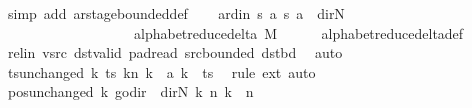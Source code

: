 \begin{isabellebody}
\ {\isacharparenleft}{\kern0pt}simp\ add{\isacharcolon}{\kern0pt}\ ar{\isacharunderscore}{\kern0pt}stage{\isacharunderscore}{\kern0pt}bounded{\isacharunderscore}{\kern0pt}def{\isacharparenright}{\kern0pt}\isanewline
\ \ \isamarkupfalse%
\ ard{\isacharunderscore}{\kern0pt}in{\isacharcolon}{\kern0pt}\ {\isachardoublequoteopen}{\isacharparenleft}{\kern0pt}{\isacharquery}{\kern0pt}s{\isacharcomma}{\kern0pt}\ {\isacharquery}{\kern0pt}a{\isacharcomma}{\kern0pt}\ {\isacharquery}{\kern0pt}s{\isacharprime}{\kern0pt}{\isacharcomma}{\kern0pt}\ {\isacharquery}{\kern0pt}a{\isacharcomma}{\kern0pt}\ {\isacharparenleft}{\kern0pt}{\isasymlambda}{\isacharunderscore}{\kern0pt}{\isachardot}{\kern0pt}\ dir{\isachardot}{\kern0pt}N{\isacharparenright}{\kern0pt}{\isacharparenright}{\kern0pt}\isanewline
\ \ \ \ \ \ \ \ \ \ \ \ \ \ \ \ \ \ {\isasymin}\ alphabet{\isacharunderscore}{\kern0pt}reduce{\isacharunderscore}{\kern0pt}delta\ M{\isachardoublequoteclose}\isanewline
\ \ \ \ \isamarkupfalse%
\ alphabet{\isacharunderscore}{\kern0pt}reduce{\isacharunderscore}{\kern0pt}delta{\isacharunderscore}{\kern0pt}def\isanewline
\ \ \ \ \isamarkupfalse%
\ rel{\isacharunderscore}{\kern0pt}in\ vsrc\ dst{\isacharunderscore}{\kern0pt}valid\ pad{\isacharunderscore}{\kern0pt}read\ src{\isacharunderscore}{\kern0pt}bounded\ dst{\isacharunderscore}{\kern0pt}bd\ \isamarkupfalse%
\ auto\isanewline
\ \ \isamarkupfalse%
\ ts{\isacharunderscore}{\kern0pt}unchanged{\isacharcolon}{\kern0pt}\ {\isachardoublequoteopen}{\isacharparenleft}{\kern0pt}{\isasymlambda}k{\isachardot}{\kern0pt}\ {\isacharparenleft}{\kern0pt}ts\ k{\isacharparenright}{\kern0pt}{\isacharparenleft}{\kern0pt}n\ k\ {\isacharcolon}{\kern0pt}{\isacharequal}{\kern0pt}\ {\isacharquery}{\kern0pt}a\ k{\isacharparenright}{\kern0pt}{\isacharparenright}{\kern0pt}\ {\isacharequal}{\kern0pt}\ ts{\isachardoublequoteclose}\ \isamarkupfalse%
\ {\isacharparenleft}{\kern0pt}rule\ ext{\isacharparenright}{\kern0pt}\ auto\isanewline
\ \ \isamarkupfalse%
\ pos{\isacharunderscore}{\kern0pt}unchanged{\isacharcolon}{\kern0pt}\ {\isachardoublequoteopen}{\isacharparenleft}{\kern0pt}{\isasymlambda}k{\isachardot}{\kern0pt}\ go{\isacharunderscore}{\kern0pt}dir\ {\isacharparenleft}{\kern0pt}{\isacharparenleft}{\kern0pt}{\isasymlambda}{\isacharunderscore}{\kern0pt}{\isachardot}{\kern0pt}\ dir{\isachardot}{\kern0pt}N{\isacharparenright}{\kern0pt}\ k{\isacharparenright}{\kern0pt}\ {\isacharparenleft}{\kern0pt}n\ k{\isacharparenright}{\kern0pt}{\isacharparenright}{\kern0pt}\ {\isacharequal}{\kern0pt}\ n{\isachardoublequoteclose}\isanewline

\end{isabellebody}
